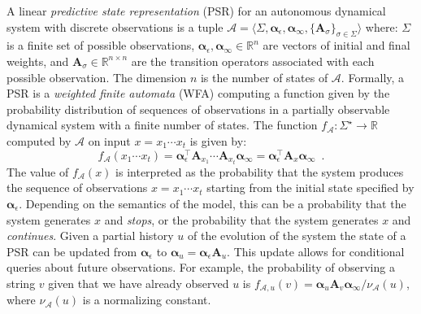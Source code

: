 \documentclass[letterpaper]{article}
\newcommand{\mat}[1]{\mathbf{#1}}
\newcommand{\A}{\mat{A}}
\newcommand{\Rset}{\mathbb{R}}
\newcommand{\alphavec}{\boldsymbol{\alpha}}
\newcommand{\aone}{\boldsymbol{\alpha}_\epsilon}
\newcommand{\ainf}{\boldsymbol{\alpha}_{\infty}}
\newcommand{\psrA}{\mathcal{A}}
\newcommand{\psrsigma}{\langle \Sigma, \aone, \ainf, \{\A_\sigma\}_{\sigma \in \Sigma} \rangle}
\begin{document}
A linear \emph{predictive state representation} (PSR) for an autonomous dynamical system with discrete observations is a tuple $\psrA = \psrsigma$ where: $\Sigma$ is a finite set of possible observations, $\aone, \ainf \in \Rset^n$ are vectors of initial and final weights, and $\A_\sigma \in \Rset^{n \times n}$ are the transition operators associated with each possible observation. The dimension $n$ is the number of states of $\psrA$. Formally, a PSR is a \emph{weighted finite automata} (WFA) \cite{wfahandbook} computing a function given by the probability distribution of sequences of observations in a partially observable dynamical system with a finite number of states. The function $f_{\psrA} : \Sigma^\star \to \Rset$ computed by $\psrA$ on input $x = x_1 \cdots x_t$ is given by:
\begin{equation*}
f_{\psrA}(x_1 \cdots x_t) = \aone^\top \A_{x_1} \cdots \A_{x_t} \ainf = \aone^\top \A_x \ainf \enspace.
\end{equation*}
%
%
The value of $f_{\psrA}(x)$ is interpreted as the probability that the system produces the sequence of observations $x = x_1 \cdots x_t$ starting from the initial state specified by $\aone$. Depending on the semantics of the model, this can be a probability that the system generates $x$ and \emph{stops}, or the probability that the system generates $x$ and \emph{continues}.
%
Given a partial history $u$ of the evolution of the system the state of a PSR can be updated from $\aone$ to $\alphavec_u = \aone \A_u$. This update allows for conditional queries about future observations. For example, the probability of observing a string $v$ given that we have already observed $u$ is
$f_{\psrA,u}(v) = \alphavec_u \A_v \ainf / \nu_{\psrA}(u)$,
where $\nu_{\psrA}(u)$ is a normalizing constant.
\end{document}

